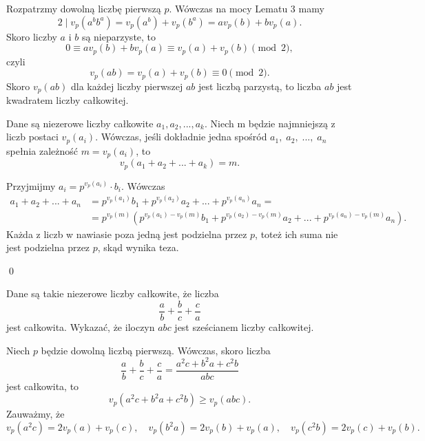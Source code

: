 \vspace{5px}


\noindent
Rozpatrzmy dowolną liczbę pierwszą $p$. Wówczas na mocy Lematu $3$ mamy
\[
	2 \mid v_p(a^bb^a) = v_p(a^b) + v_p(b^a) = av_p(b) + bv_p(a).
\]
Skoro liczby $a$ i $b$ są nieparzyste, to
\[
	0 \equiv av_p(b) + bv_p(a) \equiv v_p(a) + v_p(b) \pmod{2},
\]
czyli
\[
	v_p(ab) = v_p(a) + v_p(b) \equiv 0 \pmod{2}.
\]
Skoro $v_p(ab)$ dla każdej liczby pierwszej $ab$ jest liczbą parzystą, to liczba $ab$ jest kwadratem liczby całkowitej.


\noindent
Dane są niezerowe liczby całkowite $a_1, a_2, ..., a_k$. Niech m będzie najmniejszą z liczb postaci $v_p(a_i)$. Wówczas, jeśli dokładnie jedna spośród $a_1, \; a_2, \; ..., \; a_n$ spełnia zależność $m = v_p(a_i)$, to
\[
	v_p(a_1 + a_2 + ... + a_k) = m.
\]

\vspace{5px}


\noindent
Przyjmijmy $a_i = p^{v_p(a_i)} \cdot b_i$. Wówczas
\begin{align*}
	a_1 + a_2 + ... + a_n &= p^{v_p(a_1)}b_1 + p^{v_p(a_2)}a_2 + ... + p^{v_p(a_n)}a_n = \\
	&= p^{v_p(m)}\left(p^{v_p(a_1) - v_p(m)}b_1 + p^{v_p(a_2) - v_p(m)}a_2 + ... + p^{v_p(a_n) - v_p(m)}a_n\right).
\end{align*}
Każda z liczb w nawiasie poza jedną jest podzielna przez $p$, toteż ich suma nie jest podzielna przez $p$, skąd wynika teza.

\qed


\noindent
Dane są takie niezerowe liczby całkowite, że liczba
\[
	\frac{a}{b} + \frac{b}{c} + \frac{c}{a}
\]
jest całkowita. Wykazać, że iloczyn $abc$ jest sześcianem liczby całkowitej.

\vspace{5px}


\noindent
Niech $p$ będzie dowolną liczbą pierwszą. Wówczas, skoro liczba
\[
	\frac{a}{b} + \frac{b}{c} + \frac{c}{a} = \frac{a^2c + b^2a + c^2b}{abc}
\]
jest całkowita, to
\[
	v_p(a^2c + b^2a + c^2b) \geqslant v_p(abc).
\]
Zauważmy, że
\[
	v_p(a^2c) = 2v_p(a) + v_p(c), \quad v_p(b^2a) = 2v_p(b) + v_p(a), \quad v_p(c^2b) = 2v_p(c) + v_p(b).
\]

